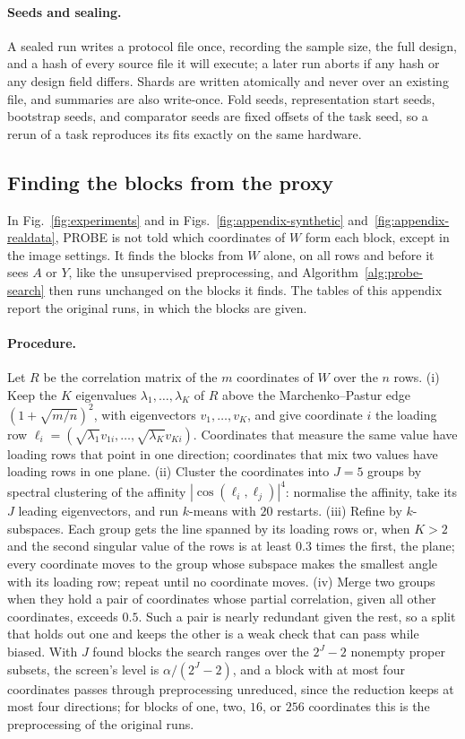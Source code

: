 {\paragraph{Seeds and sealing.} A sealed run writes a protocol file once, recording the sample size, the full design, and a hash of every source file it will execute; a later run aborts if any hash or any design field differs. Shards are written atomically and never over an existing file, and summaries are also write-once. Fold seeds, representation start seeds, bootstrap seeds, and comparator seeds are fixed offsets of the task seed, so a rerun of a task reproduces its fits exactly on the same hardware.
}

\subsection{Finding the blocks from the proxy}
\label{sec:appendix-block-discovery}

In Fig.~\ref{fig:experiments} and in Figs.~\ref{fig:appendix-synthetic} and~\ref{fig:appendix-realdata}, PROBE is not told which coordinates of $W$ form each block, except in the image settings. It finds the blocks from $W$ alone, on all rows and before it sees $A$ or $Y$, like the unsupervised preprocessing, and Algorithm~\ref{alg:probe-search} then runs unchanged on the blocks it finds. The tables of this appendix report the original runs, in which the blocks are given.

\paragraph{Procedure.} Let $R$ be the correlation matrix of the $m$ coordinates of $W$ over the $n$ rows. (i) Keep the $K$ eigenvalues $\lambda_1,\dots,\lambda_K$ of $R$ above the Marchenko--Pastur edge $(1+\sqrt{m/n})^2$, with eigenvectors $v_1,\dots,v_K$, and give coordinate $i$ the loading row $\ell_i=(\sqrt{\lambda_1}v_{1i},\dots,\sqrt{\lambda_K}v_{Ki})$. Coordinates that measure the same value have loading rows that point in one direction; coordinates that mix two values have loading rows in one plane. (ii) Cluster the coordinates into $J=5$ groups by spectral clustering of the affinity $|\cos(\ell_i,\ell_j)|^4$: normalise the affinity, take its $J$ leading eigenvectors, and run $k$-means with $20$ restarts. (iii) Refine by $k$-subspaces. Each group gets the line spanned by its loading rows or, when $K>2$ and the second singular value of the rows is at least $0.3$ times the first, the plane; every coordinate moves to the group whose subspace makes the smallest angle with its loading row; repeat until no coordinate moves. (iv) Merge two groups when they hold a pair of coordinates whose partial correlation, given all other coordinates, exceeds $0.5$. Such a pair is nearly redundant given the rest, so a split that holds out one and keeps the other is a weak check that can pass while biased. With $J$ found blocks the search ranges over the $2^J-2$ nonempty proper subsets, the screen's level is $\alpha/(2^J-2)$, and a block with at most four coordinates passes through preprocessing unreduced, since the reduction keeps at most four directions; for blocks of one, two, $16$, or $256$ coordinates this is the preprocessing of the original runs.

